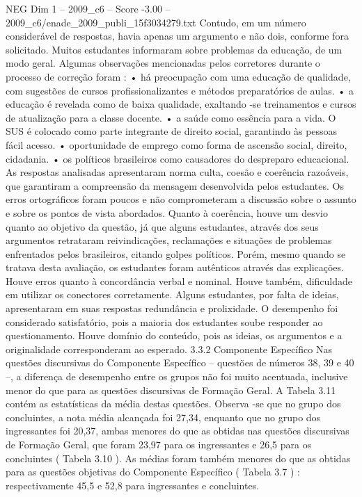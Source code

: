 \begin{textsample}{NEG Dim 1 – 2009\_c6 – Score -3.00 – 2009\_c6/enade\_2009\_publi\_15f3034279.txt}
Contudo, em um número considerável de respostas, havia apenas um argumento e não dois, conforme fora solicitado.
Muitos estudantes informaram sobre problemas da educação, de um modo geral.
Algumas observações mencionadas pelos corretores durante o processo de correção foram : • há preocupação com uma educação de qualidade, com sugestões de cursos profissionalizantes e métodos preparatórios de aulas. • a educação é revelada como de baixa qualidade, exaltando -se treinamentos e cursos de atualização para a classe docente. • a saúde como essência para a vida.
O SUS é colocado como parte integrante de direito social, garantindo às pessoas fácil acesso. • oportunidade de emprego como forma de ascensão social, direito, cidadania. • os políticos brasileiros como causadores do despreparo educacional.
As respostas analisadas apresentaram norma culta, coesão e coerência razoáveis, que garantiram a compreensão da mensagem desenvolvida pelos estudantes.
Os erros ortográficos foram poucos e não comprometeram a discussão sobre o assunto e sobre os pontos de vista abordados.
Quanto à coerência, houve um desvio quanto ao objetivo da questão, já que alguns estudantes, através dos seus argumentos retrataram reivindicações, reclamações e situações de problemas enfrentados pelos brasileiros, citando golpes políticos.
Porém, mesmo quando se tratava desta avaliação, os estudantes foram autênticos através das explicações.
Houve erros quanto à concordância verbal e nominal.
Houve também, dificuldade em utilizar os conectores corretamente.
Alguns estudantes, por falta de ideias, apresentaram em suas respostas redundância e prolixidade.
O desempenho foi considerado satisfatório, pois a maioria dos estudantes soube responder ao questionamento.
Houve domínio do conteúdo, pois as ideias, os argumentos e a originalidade corresponderam ao esperado. 3.3.2 Componente Específico Nas questões discursivas do Componente Específico – questões de números 38, 39 e 40 –, a diferença de desempenho entre os grupos não foi muito acentuada, inclusive menor do que para as questões discursivas de Formação Geral.
A Tabela 3.11 contém as estatísticas da média destas questões.
Observa -se que no grupo dos concluintes, a nota média alcançada foi 27,34, enquanto que no grupo dos ingressantes foi 20,37, ambas menores do que as obtidas nas questões discursivas de Formação Geral, que foram 23,97 para os ingressantes e 26,5 para os concluintes ( Tabela 3.10 ).
As médias foram também menores do que as obtidas para as questões objetivas do Componente Específico ( Tabela 3.7 ) : respectivamente 45,5 e 52,8 para ingressantes e concluintes.

\end{textsample}
